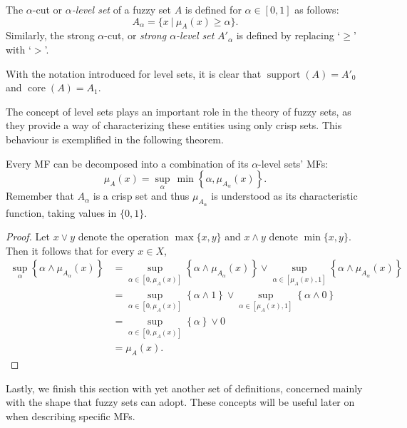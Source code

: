 \begin{definition} The $\alpha$-cut or \textit{$\alpha$-level set} of a fuzzy set $A$ is defined for $\alpha \in [0,1]$ as follows:
\[
A_\alpha = \{ x \ | \ \mu_A(x) \ge \alpha \}.
\]
Similarly, the strong $\alpha$-cut, or \textit{strong $\alpha$-level set} $A'_\alpha$ is defined by replacing `$\ge$' with `$>$'.

\end{definition}

\begin{remark} With the notation introduced for level sets, it is clear that $\operatorname{support}(A) = A'_0$ and $\operatorname{core}(A) = A_1$.

\end{remark}

The concept of level sets plays an important role in the theory of fuzzy sets, as they provide a way of characterizing these entities using only crisp sets. This behaviour is exemplified in the following theorem.

\begin{theorem} Every MF can be decomposed into a combination of its $\alpha$-level sets' MFs:
\[
\mu_A(x) = \sup_\alpha \, \min \left\{ \alpha, \mu_{A_\alpha}(x) \right\}.
\]
Remember that $A_\alpha$ is a crisp set and thus $\mu_{A_\alpha}$ is understood as its characteristic function, taking values in $\{0,1\}$.
\end{theorem}
\begin{proof}
  Let $x \lor y$ denote the operation $\max \{x,y\}$ and $x \land y$ denote $\min\{x,y\}$. Then it follows that for every $x\in X$,
  \begin{align*}
    \sup_\alpha \left\{ \alpha \land \mu_{A_\alpha}(x) \right\} &= \sup_{\alpha \in [0,\mu_A(x)]} \left\{ \alpha \land \mu_{A_\alpha}(x) \right\} \lor \sup_{\alpha \in [\mu_A(x), 1]} \left\{ \alpha \land \mu_{A_\alpha}(x) \right\}\\
    &= \sup_{\alpha \in [0,\mu_A(x)]} \left\{ \alpha \land 1 \right\} \lor \sup_{\alpha \in [\mu_A(x), 1]} \left\{ \alpha \land 0 \right\}\\
    &= \sup_{\alpha \in [0,\mu_A(x)]} \left\{ \alpha  \right\} \lor 0\\
    &= \mu_A(x).
  \end{align*}

\end{proof}

Lastly, we finish this section with yet another set of definitions, concerned mainly with the shape that fuzzy sets can adopt. These concepts will be useful later on when describing specific MFs.

